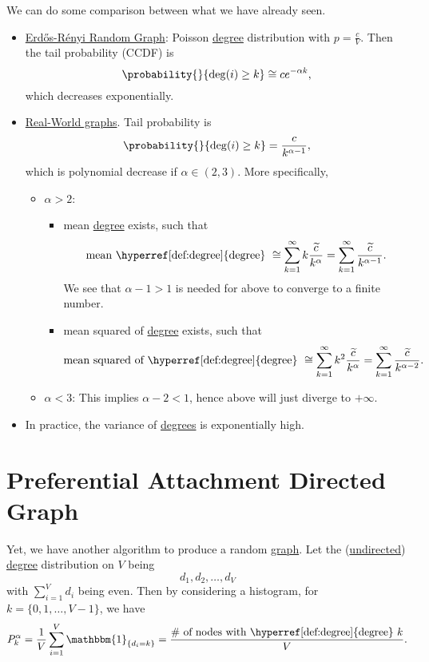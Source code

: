 \begin{remark}
	We can do some comparison between what we have already seen.
	\begin{itemize}
		\item \hyperref[sec:Erdos-Renyi-random-graphs-family]{Erdős-Rényi Random Graph}:
		      Poisson \hyperref[def:degree]{degree} distribution with \(p = \frac{c}{V}\). Then the tail probability (CCDF) is
		      \[
			      \probability{}{\deg (i)\geq k}\cong c e^{-\alpha k},
		      \]
		      which decreases exponentially.
		\item \hyperref[sec:real-world-graphs]{Real-World graphs}. Tail probability is
		      \[
			      \probability{}{\deg(i) \geq k} = \frac{c}{k^{\alpha - 1}},
		      \]
		      which is polynomial decrease if \(\alpha\in(2, 3)\). More specifically,
		      \begin{itemize}
			      \item \(\alpha>2\):
			            \begin{itemize}
				            \item mean \hyperref[def:degree]{degree} exists, such that
				                  \[
					                  \text{mean \hyperref[def:degree]{degree} }\cong \sum\limits_{k=1}^{\infty} k \frac{\widetilde{c}}{k^{\alpha}} = \sum\limits_{k=1}^{\infty} \frac{\widetilde{c}}{k^{\alpha - 1}}.
				                  \]
				                  We see that \(\alpha - 1 > 1\) is needed for above to converge to a finite number.
				            \item mean squared of \hyperref[def:degree]{degree} exists, such that
				                  \[
					                  \text{mean squared of \hyperref[def:degree]{degree} }\cong \sum\limits_{k=1}^{\infty} k^2 \frac{\widetilde{c}}{k^{\alpha}} = \sum\limits_{k=1}^{\infty} \frac{\widetilde{c}}{k^{\alpha-2}}.
				                  \]
			            \end{itemize}
			      \item \(\alpha<3\): This implies \(\alpha - 2 < 1\), hence above will just diverge to \(+\infty\).
		      \end{itemize}
		\item In practice, the variance of \hyperref[def:degree]{degrees} is exponentially high.
	\end{itemize}
\end{remark}

\section{Preferential Attachment Directed Graph}
Yet, we have another algorithm to produce a random \hyperref[def:graph]{graph}. Let the (\hyperref[def:undirected-graph]{undirected}) \hyperref[def:degree]{degree}
distribution on \(V\) being
\[
	d_1, d_2, \ldots , d_V
\]
with \(\sum\limits_{i=1}^{V} d_i\) being even. Then by considering a histogram, for \(k = \{0, 1, \ldots , V - 1\}\), we have
\[
	P_k^{\alpha} = \frac{1}{V}\sum\limits_{i=1}^{V} \mathbbm{1}_{\{d_i = k\}} = \frac{\#\text{ of nodes with \hyperref[def:degree]{degree} }k}{V}.
\]

